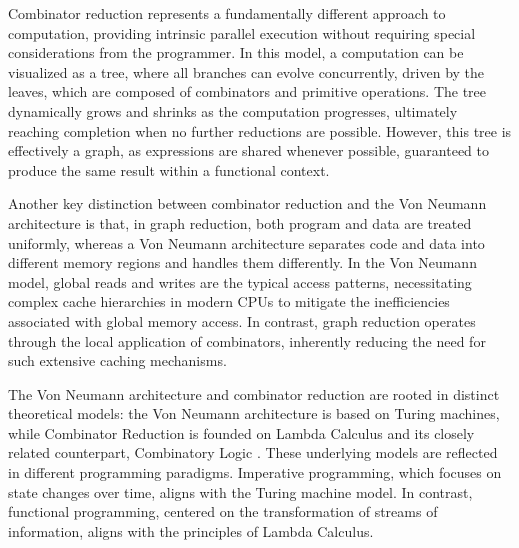 \documentclass{IEEEtran}
\begin{document}
\par Combinator reduction \cite{Arch}\cite{Graph}\cite{ParComb} represents a fundamentally different approach to computation, providing intrinsic parallel execution without requiring special considerations from the programmer. In this model, a computation can be visualized as a tree, where all branches can evolve concurrently, driven by the leaves, which are composed of combinators and primitive operations. The tree dynamically grows and shrinks as the computation progresses, ultimately reaching completion when no further reductions are possible. However, this tree is effectively a graph, as expressions are shared whenever possible, guaranteed to produce the same result within a functional context.

\par Another key distinction between combinator reduction and the Von Neumann architecture is that, in graph reduction, both program and data are treated uniformly, whereas a Von Neumann architecture separates code and data into different memory regions and handles them differently. In the Von Neumann model, global reads and writes are the typical access patterns, necessitating complex cache hierarchies in modern CPUs to mitigate the inefficiencies associated with global memory access. In contrast, graph reduction operates through the local application of combinators, inherently reducing the need for such extensive caching mechanisms.

\par The Von Neumann architecture and combinator reduction are rooted in distinct theoretical models: the Von Neumann architecture is based on Turing machines, while Combinator Reduction is founded on Lambda Calculus \cite{Barend} and its closely related counterpart, Combinatory Logic \cite{Bimbo}. These underlying models are reflected in different programming paradigms. Imperative programming, which focuses on state changes over time, aligns with the Turing machine model. In contrast, functional programming, centered on the transformation of streams of information, aligns with the principles of Lambda Calculus.
\end{document}
